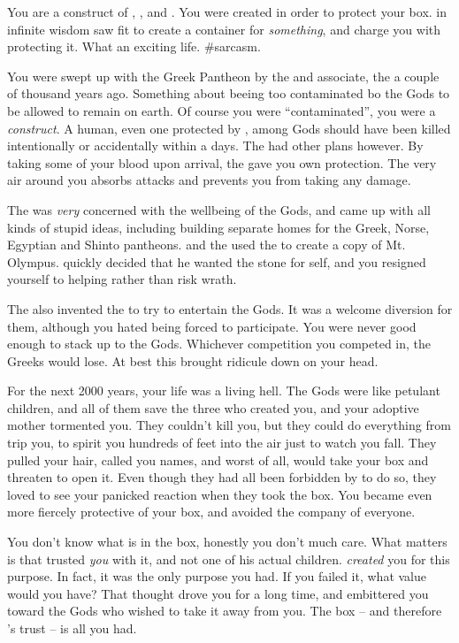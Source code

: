 \documentclass[char]{guardians}
\begin{document}
\name{\cPandora{}}

You are a construct of \cZeus{}, \cAthena{}, and \cHephaestus{}. You were created in order to protect your box.  \cZeus{} in \cZeus{\their} infinite wisdom saw fit to create a container for \emph{something}, and charge you with protecting it. What an exciting life. \#sarcasm.

You were swept up with the Greek Pantheon by the \cWarden{} and \cWarden{\their} associate, the \cCaretaker{} a couple of thousand years ago. Something about beeing too contaminated bo the Gods to be allowed to remain on earth. Of course you were ``contaminated'', you were a \emph{construct}. A human, even one protected by \cZeus{}, among Gods should have been killed intentionally or accidentally within a days. The \cWarden{} had other plans however. By taking some of your blood upon arrival, the \cWarden{} gave you \cWarden{\their} own protection. The very air around you absorbs attacks and prevents you from taking any damage.

The \cCaretaker{} was \emph{very} concerned with the wellbeing of the Gods, and came up with all kinds of stupid ideas, including building separate homes for the Greek, Norse, Egyptian and Shinto pantheons. \cCaretaker{\They} and the \cWarden{} used the \stone{} to create a copy of Mt. Olympus. \cZeus{} quickly decided that he wanted the stone for \cZeus{\them}self, and you resigned yourself to helping rather than risk \cZeus{\their} wrath.

The \cCaretaker{} also invented the \pGames{} to try to entertain the Gods. It was a welcome diversion for them, although you hated being forced to participate. You were never good enough to stack up to the Gods. Whichever competition you competed in, the Greeks would lose. At best this brought ridicule down on your head.

For the next 2000 years, your life was a living hell. The Gods were like petulant children, and all of them save the three who created you, and your adoptive mother \cHera{} tormented you. They couldn't kill you, but they could do everything from trip you, to spirit you hundreds of feet into the air just to watch you fall.  They pulled your hair, called you names, and worst of all, would take your box and threaten to open it.  Even though they had all been forbidden by \cZeus{} to do so, they loved to see your panicked reaction when they took the box. You became even more fiercely protective of your box, and avoided the company of everyone. 

You don't know what is in the box, honestly you don't much care. What matters is that \cZeus{} trusted \emph{you} with it, and not one of his actual children. \cZeus{\They} \emph{created} you for this purpose. In fact, it was the only purpose you had. If you failed it, what value would you have? That thought drove you for a long time, and embittered you toward the Gods who wished to take it away from you. The box -- and therefore \cZeus{}'s trust -- is all you had.
\end{document}

